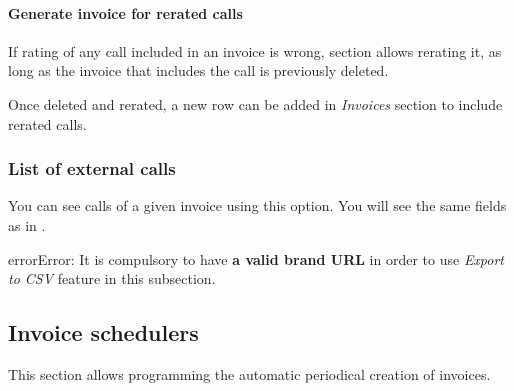 \documentclass[letterpaper,10pt,spanish]{sphinxmanual}
\begin{document}
\paragraph{Generate invoice for rerated calls}
\label{administration_portal/brand/invoicing/invoices:generate-invoice-for-rerated-calls}
If rating of any call included in an invoice is wrong, {\hyperref[administration_portal/platform/external_calls:external\string-calls]{}} section allows rerating it, as long as the
invoice that includes the call is previously deleted.

Once deleted and rerated, a new row can be added in \emph{Invoices} section to include rerated calls.


\subsubsection{List of external calls}
\label{administration_portal/brand/invoicing/invoices:list-of-external-calls}
You can see calls of a given invoice using this option. You will see the same fields as in {\hyperref[administration_portal/platform/external_calls:external\string-calls]{}}.

\begin{notice}{error}{Error:}
It is compulsory to have \textbf{a valid brand URL} in order to use \emph{Export to CSV} feature in this subsection.
\end{notice}


\subsection{Invoice schedulers}
\label{administration_portal/brand/invoicing/invoice_schedulers::doc}\label{administration_portal/brand/invoicing/invoice_schedulers:invoice-schedulers}
This section allows programming the automatic periodical creation of invoices.
\end{document}
